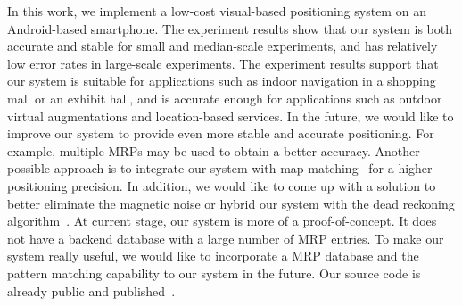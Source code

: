 In this work, we implement a low-cost visual-based positioning system on an Android-based smartphone. The experiment results show that our system is both accurate and stable for small and median-scale experiments, and has relatively low error rates in large-scale experiments. The experiment results support that our system is suitable for applications such as indoor navigation in a shopping mall or an exhibit hall, and is accurate enough for applications such as outdoor virtual augmentations and location-based services. In the future, we would like to improve our system to provide even more stable and accurate positioning. For example, multiple MRPs may be used to obtain a better accuracy. Another possible approach is to integrate our system with map matching~\cite{bernstein1998introduction} for a higher positioning precision. In addition, we would like to come up with a solution to better eliminate the magnetic noise or hybrid our system with the dead reckoning algorithm~\cite{jin2011robust}. At current stage, our system is more of a proof-of-concept. It does not have a backend database with a large number of MRP entries. To make our system really useful, we would like to incorporate a MRP database and the pattern matching capability to our system in the future. Our source code is already public and published~\cite{source-code}.